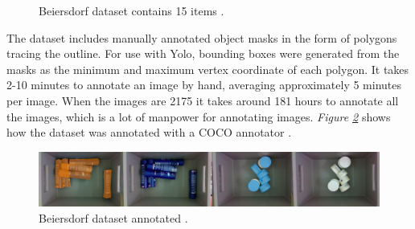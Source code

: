 \begin{figure}[h]
 \hfill
 \hfill
 \hfill
 \hfill
 \hfill
 \hfill
 \caption{Beiersdorf dataset contains 15 items \cite{bjarnason_detecting_2021}.}
 \label{fig:beiersdorf}
\end{figure}

The dataset includes manually annotated object masks in the form of polygons tracing the outline. For use with Yolo, bounding boxes were generated from the masks as the minimum and maximum vertex coordinate of each polygon.
It takes 2-10 minutes to annotate an image by hand, averaging approximately 5 minutes per image. When the images are 2175 it takes around 181 hours to annotate all the images, which is a lot of manpower for annotating images. \textit{Figure \ref{fig:beiersdorfanno}} shows how the dataset was annotated with a COCO annotator \cite{brooks_jsbrokscoco-annotator_2021}.
\begin{figure}[h]
 \centering
 \includegraphics[width=1\textwidth, angle =0]{graphics/methods/sverrirannotated.PNG}
 \caption{Beiersdorf dataset annotated \cite{bjarnason_detecting_2021}.}
 \label{fig:beiersdorfanno}
\end{figure}

